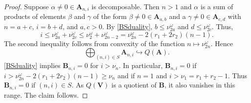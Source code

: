 \documentclass[11pt,letterpaper]{amsart}
\newcommand{\bk}{\mathbbm{k}}
\DeclareMathOperator{\Sp}{Sp}
\newcommand{\VV}{\mathbf{V}}
\newcommand{\HH}{\mathbf{B}}
\newcommand{\HA}{\mathbf{A}}
\newcommand{\bQ}{\mathbb{Q}}\newcommand{\bR}{\mathbb{R}}
\numberwithin{theoremcounter}{section}
\newtheorem{lemma}[lemmaauto]{Lemma}
\newtheorem{corollary}[corollaryauto]{Corollary}
\theoremstyle{definition}
\theoremstyle{remark}
\DeclareMathOperator{\GL}{GL}
\DeclareMathOperator{\St}{St}
\begin{document}
\begin{proof}
    Suppose $\alpha \neq 0 \in \HA_{n,i}$ is decomposable. Then $n>1$ and $\alpha$ is a sum of products of elements $\beta$ and $\gamma$ of the form $\beta \neq 0 \in \HA_{a,b}$ and a $\gamma \neq 0 \in \HA_{c,d}$ with $n=a+c$, $i=b+d$, and $a,c>0$. By \autoref{BSduality}, $b \leq \nu_{2a}^\omega$ and $d \leq \nu_{2c}^\omega$. Thus, $$i \leq \nu_{2a}^\omega+\nu_{2c}^\omega \leq \nu_{2}^\omega+\nu_{2n-2}^\omega = \nu_{2n}^\omega - 2(r_1+2r_2)(n-1).$$ The second inequality follows from convexity of the function $n \mapsto \nu^\omega_{2n}.$    
    Hence
    $$\bigoplus_{(n,i) \in S} \HA_{n,i} \hookrightarrow  Q(\HA).$$ \autoref{BSduality} implies $\HH_{n,i}=0$ for $i>\nu_n$. In particular, $\HH_{n,i} = 0$ if $i > \nu_{2n}^\omega - 2(r_1+2r_2)(n-1) \ge \nu_n$ and if $n=1$ and $i> \nu_1 =  r_1+r_2-1$. Thus $\HH_{n,i} = 0$ if $(n,i)\in S$. As $Q(\VV)$ is a quotient of $\HH$, it also vanishes in this range. The claim follows. 
\end{proof}

\end{document}
